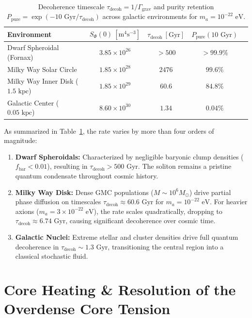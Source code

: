 \documentclass[aps,prd,twocolumn,superscriptaddress,nofootinbib,floatfix,longbibliography]{revtex4-2}
\begin{document}
\begin{table}[t]
\centering
\caption{Decoherence timescale $\tau_{\text{decoh}} = 1/\Gamma_{\text{grav}}$ and purity retention $P_{\text{pure}} = \exp(-10\text{ Gyr}/\tau_{\text{decoh}})$ across galactic environments for $m_a = 10^{-22}\text{ eV}$.}
\begin{tabular}{lcccc}
\toprule
Environment & $S_\Phi(0)\ [\text{m}^4\text{s}^{-3}]$ & $\tau_{\text{decoh}}\ [\text{Gyr}]$ & $P_{\text{pure}}(10\text{ Gyr})$ \\
\midrule
Dwarf Spheroidal (Fornax) & $3.85 \times 10^{26}$ & $> 500$ & $> 99.9\%$ \\
Milky Way Solar Circle & $1.85 \times 10^{28}$ & $2476$ & $99.6\%$ \\
Milky Way Inner Disk ($1.5\text{ kpc}$) & $1.85 \times 10^{29}$ & $60.6$ & $84.8\%$ \\
Galactic Center ($0.05\text{ kpc}$) & $8.60 \times 10^{30}$ & $1.34$ & $0.04\%$ \\
\bottomrule
\end{tabular}
\label{tab:environments}
\end{table}

As summarized in Table~\ref{tab:environments}, the rate varies by more than four orders of magnitude:
\begin{enumerate}
\item \textbf{Dwarf Spheroidals:} Characterized by negligible baryonic clump densities ($f_{\text{bar}} < 0.01$), resulting in $\tau_{\text{decoh}} > 500\text{ Gyr}$. The soliton remains a pristine quantum condensate throughout cosmic history.
\item \textbf{Milky Way Disk:} Dense GMC populations ($M \sim 10^6 M_\odot$) drive partial phase diffusion on timescales $\tau_{\text{decoh}} \approx 60.6\text{ Gyr}$ for $m_a = 10^{-22}\text{ eV}$. For heavier axions ($m_a = 3 \times 10^{-22}\text{ eV}$), the rate scales quadratically, dropping to $\tau_{\text{decoh}} \approx 6.74\text{ Gyr}$, causing significant decoherence over cosmic time.
\item \textbf{Galactic Nuclei:} Extreme stellar and cluster densities drive full quantum decoherence in $\tau_{\text{decoh}} \sim 1.3\text{ Gyr}$, transitioning the central region into a classical stochastic fluid.
\end{enumerate}

\section{Core Heating \& Resolution of the Overdense Core Tension}
\label{sec:core}
\end{document}
